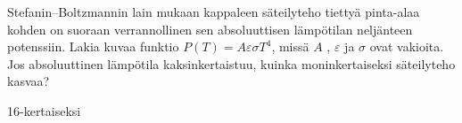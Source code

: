 \begin{tehtavasivu}
\begin{tehtava}
Stefanin--Boltzmannin lain mukaan kappaleen säteilyteho tiettyä pinta-alaa kohden on suoraan verrannollinen sen absoluuttisen lämpötilan neljänteen potenssiin. Lakia kuvaa funktio $ P(T)=A\varepsilon\sigma T^4 $, missä $A$ , $\varepsilon$ ja $\sigma $ ovat vakioita. Jos absoluuttinen lämpötila kaksinkertaistuu, kuinka moninkertaiseksi säteilyteho kasvaa?%
\begin{vastaus}
16-kertaiseksi
\end{vastaus}
\end{tehtava}

\end{tehtavasivu}
